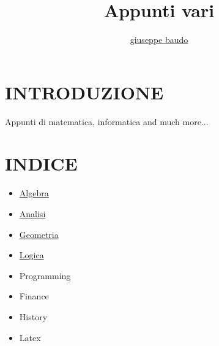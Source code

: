 \documentclass[a4paper,10pt]{article}
\title{Appunti vari}
\author{\href{http://www.baudo.hol.es}{giuseppe baudo}}
\begin{document}
\maketitle

\section{INTRODUZIONE}
Appunti di matematica, informatica and much more...

\section{INDICE}
\begin{itemize}
  \item \href{./algebra/AlgebraIndex.html}{Algebra}
  \item \href{./analisi/Analisi.html}{Analisi} 
  \item \href{./geometria/Geometria.html}{Geometria} 
  \item \href{./logica/Logics.html}{Logica}
  \item Programming
  \item Finance 
  \item History 
  \item Latex 
  
\end{itemize}
\end{document}
